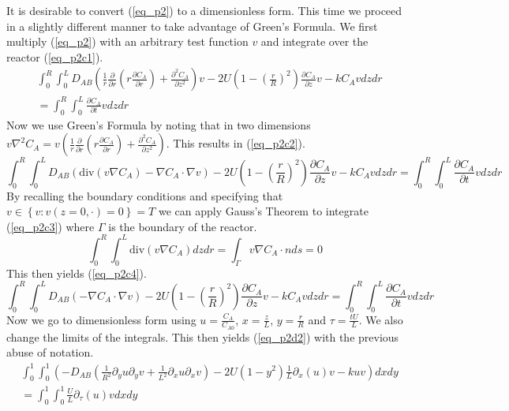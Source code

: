 \documentclass[11pt,fleqn]{article}
\theoremstyle{defstyle}
\begin{document}
It is desirable to convert (\ref{eq_p2}) to a dimensionless form. This time we proceed in a slightly different manner to take advantage of Green's Formula. We first multiply (\ref{eq_p2}) with an arbitrary test function $v$ and integrate over the reactor (\ref{eq_p2c1}). 
\begin{equation}
\begin{aligned}
&\int_0^R \int_0^L D_{AB}\left(\frac{1}{r}\frac{\partial}{\partial r}\left(r\frac{\partial C_A}{\partial r}\right) + \frac{\partial^2 C_A}{\partial z^2}\right)v - 2U\left(1-\left(\frac{r}{R}\right)^2\right)\frac{\partial C_A}{\partial z}v - kC_Av dzdr \\ &= \int_0^R \int_0^L \frac{\partial C_A}{\partial t}v dzdr
\end{aligned}
\label{eq_p2c1}
\end{equation}
Now we use Green's Formula by noting that in two dimensions $v\nabla^2C_A = v(\frac{1}{r}\frac{\partial}{\partial r}(r\frac{\partial C_A}{\partial r}) + \frac{\partial^2 C_A}{\partial z^2})$. This results in (\ref{eq_p2c2}).
\begin{equation}
\int_0^R \int_0^L D_{AB}(\text{div}(v\nabla C_A)-\nabla C_A \cdot \nabla v ) - 2U\left(1-\left(\frac{r}{R}\right)^2\right)\frac{\partial C_A}{\partial z}v - kC_Av dzdr = \int_0^R \int_0^L \frac{\partial C_A}{\partial t}v dzdr
\label{eq_p2c2}
\end{equation}
By recalling the boundary conditions and specifying that $v \in \left\{v : v(z=0,\cdot)=0 \right\} = T$ we can apply Gauss's Theorem to integrate (\ref{eq_p2c3}) where $\Gamma$ is the boundary of the reactor.
\begin{equation}
\int_0^R \int_0^L \text{div}(v\nabla C_A)dzdr = \int_\Gamma v\nabla C_A \cdot n ds = 0 
\label{eq_p2c3}
\end{equation}
This then yields (\ref{eq_p2c4}).
\begin{equation}
\int_0^R \int_0^L D_{AB}(-\nabla C_A \cdot \nabla v ) - 2U\left(1-\left(\frac{r}{R}\right)^2\right)\frac{\partial C_A}{\partial z}v - kC_Av dzdr = \int_0^R \int_0^L \frac{\partial C_A}{\partial t}v dzdr
\label{eq_p2c4}
\end{equation}
Now we go to dimensionless form using $u=\frac{C_A}{C_{A0}}$, $x = \frac{z}{L}$, $y = \frac{r}{R}$ and $\tau = \frac{tU}{L}$. We also change the limits of the integrals. This then yields (\ref{eq_p2d2}) with the previous abuse of notation. 
\begin{equation}
\begin{aligned}
&\int_0^1 \int_0^1 \left(-D_{AB}\left(\frac{1}{R^2}\partial_y u \partial_y v + \frac{1}{L^2}\partial_x u \partial_xv\right) - 2U\left(1-y^2\right)\frac{1}{L}\partial_x(u) v - kuv\right)dxdy \\ &= \int_0^1 \int_0^1 
\frac{U}{L} \partial_\tau(u) v dxdy
\end{aligned}
\label{eq_p2d2}
\end{equation}
\end{document}
